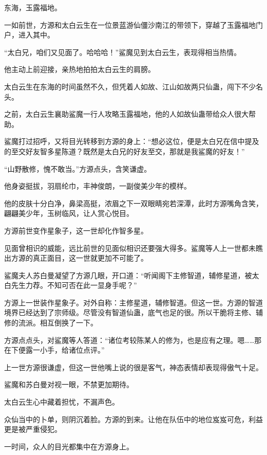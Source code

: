 
\begin{this_body}



东海，玉露福地。

一如前世，方源和太白云生在一位景蓝游仙僵沙南江的带领下，穿越了玉露福地门户，进入其中。

“太白兄，咱们又见面了。哈哈哈！”鲨魔见到太白云生，表现得相当热情。

他主动上前迎接，亲热地拍拍太白云生的肩膀。

太白云生在东海的时间虽然不久，但凭着人如故、江山如故两只仙蛊，闯下不少名头。

之前，太白云生襄助鲨魔一行人攻略玉露福地，他的人如故仙蛊带给众人很大帮助。

鲨魔打过招呼，又将目光转移到方源的身上：“想必这位，便是太白兄在信中提及的至交好友智多星陈道？既然是太白兄的好友至交，那就是我鲨魔的好友！”

“山野散修，愧不敢当。”方源点头，含笑谦虚。

他身姿挺拔，羽扇纶巾，丰神俊朗，一副俊美少年的模样。

他的皮肤十分白净，鼻梁高挺，浓眉之下一双眼睛宛若深潭，此时方源嘴角含笑，翩翩美少年，玉树临风，让人赏心悦目。

方源前世变作星象子，这一世却化作智多星。

见面曾相识的威能，远比前世的见面似相识还要强大得多。鲨魔等人上一世都未瞧出方源的真正面目，这一世就更加不可能了。

鲨魔夫人苏白曼凝望了方源几眼，开口道：“听闻阁下主修智道，辅修星道，被太白先生力荐。不知可否在此一显身手呢？”

方源上一世装作星象子。对外自称：主修星道，辅修智道。但这一世。方源的智道境界已经达到了宗师级。尽管没有智道仙蛊，底气也足的很。所以干脆将主修、辅修的流派。相互倒换了一下。

方源点点头，对鲨魔等人答道：“诸位考较陈某人的修为，也是应有之理。嗯……那在下便露一小手，给诸位点评。”

上一世方源很谦虚，但这一世他嘴上说的很是客气，神态表情却表现得傲气十足。

鲨魔和苏白曼对视一眼，不禁更加期待。

太白云生心中藏着担忧，不漏声色。

众仙当中的卜单，则阴沉着脸。方源的到来。让他在队伍中的地位岌岌可危，利益更是被严重侵犯。

一时间，众人的目光都集中在方源身上。


\end{this_body}
